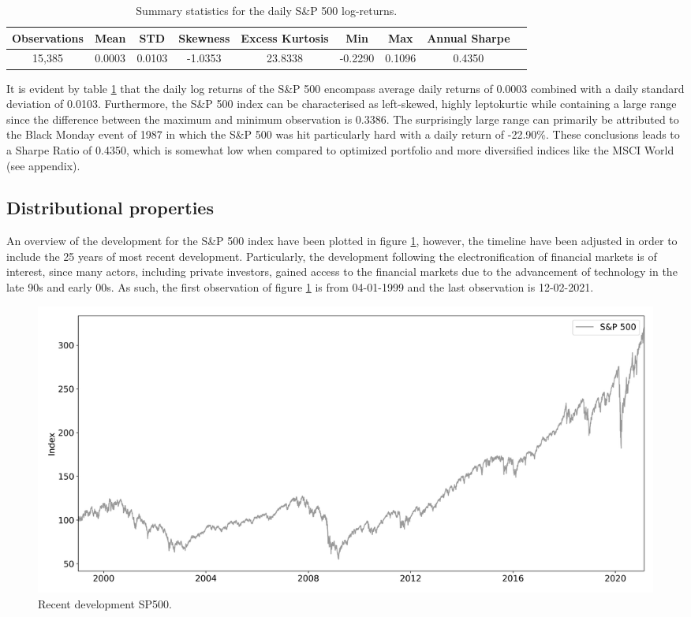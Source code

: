 \begin{table}[H]
\small
\caption{Summary statistics for the daily S\&P 500 log-returns.}
\centering
\begin{tabular}{c c c c c c c c c} 
\hline\hline
Observations & Mean & STD & Skewness & Excess Kurtosis & Min & Max & Annual Sharpe \\
\hline
15,385 & 0.0003 & 0.0103 & -1.0353 & 23.8338 & -0.2290 & 0.1096 & 0.4350 \\
\hline
\end{tabular}
\label{tab:summary_stats_S&P500}
\end{table}
 
It is evident by table \ref{tab:summary_stats_S&P500} that the daily log returns of the S\&P 500 encompass average daily returns of 0.0003 combined with a daily standard deviation of 0.0103. Furthermore, the S\&P 500 index can be characterised as left-skewed, highly leptokurtic while containing a large range since the difference between the maximum and minimum observation is 0.3386. The surprisingly large range can primarily be attributed to the Black Monday event of 1987 in which the S\&P 500 was hit particularly hard with a daily return of -22.90\%. These conclusions leads to a Sharpe Ratio of 0.4350, which is somewhat low when compared to optimized portfolio and more diversified indices like the MSCI World (see appendix).

\subsection{Distributional properties} An overview of the development for the S\&P 500 index have been plotted in figure \ref{fig: all_indices_index}, however, the timeline have been adjusted in order to include the 25 years of most recent development. Particularly, the development following the electronification of financial markets is of interest, since many actors, including private investors, gained access to the financial markets due to the advancement of technology in the late 90s and early 00s. As such, the first observation of figure \ref{fig: all_indices_index} is from 04-01-1999 and the last observation is 12-02-2021. 
\begin{figure}[H] 
    \centering
    \includegraphics[width=1.0\textwidth]{analysis/data_description/images/adjusted SP500.png}
    \caption{Recent development SP500.}
    \label{fig: all_indices_index} 
\end{figure}

